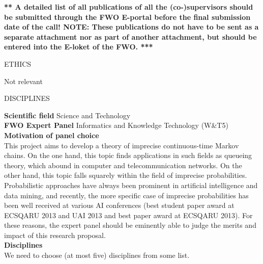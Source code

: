 \documentclass[11pt,dvipsnames,usenames,a4paper]{article}
\begin{document}






{\color{blue}\bf *** A detailed list of all publications of all the (co-)supervisors should be submitted through the FWO E-portal before the final submission date of the call!
NOTE: These publications do not have to be sent as a separate attachment nor as part of another attachment, but should be entered into the E-loket of the FWO. ***}

\vspace{5mm}

\begin{shaded}\centering ETHICS \end{shaded}

Not relevant

\vspace{5mm}

\begin{shaded}\centering DISCIPLINES \end{shaded}

{\bf Scientific field} \tab Science and Technology \\
{\bf FWO Expert Panel} \tab Informatics and Knowledge Technology (W\&T5) \\[8pt]
{\bf Motivation of panel choice}\\[6pt]
This project aims to develop a theory of imprecise continuous-time Markov chains. On the one hand, this topic finds applications in such fields as queueing theory, which abound in computer and telecommunication networks. On the other hand, this topic falls squarely within the field of imprecise probabilities. Probabilistic approaches have always been prominent in artificial intelligence and data mining, and recently, the more specific case of imprecise probabilities has been well received at various AI conferences (best student paper award at ECSQARU 2013 and UAI 2013 and best paper award at ECSQARU 2013). For these reasons, the expert panel should be eminently able to judge the merits and impact of this research proposal.\\[8pt]
{\bf Disciplines}\\[6pt]
We need to choose (at most five) disciplines from some list.
\end{document}
